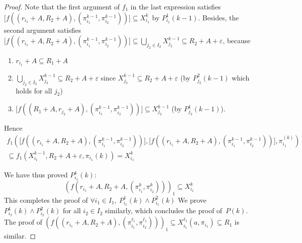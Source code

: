 \begin{proof}
 Note that  the first argument of $f_1$ in the last expression satisfies
  $\lbrack f((r_{i_1}+A,R_2+A),(\pi_{i_1}^{k-1},\pi_{i_2}^{k-1}))\rbrack \subseteq X_{i_1}^k $
  by $P_{i_1}^1(k-1)$. Besides, the second argument
  satisfies $\lbrack f((r_{i_1}+A,R_2+A),(\pi_{i_1}^{k-1},\pi_{i_2}^{k-1})) \rbrack
  \subseteq \bigcup_{j_2 \in I_2}X_{j_2}^{k-1} \subseteq R_2 + A + \varepsilon$, because 
  \begin{enumerate}
   \item $r_{i_1} + A \subseteq R_{1}+A$
   \item $\bigcup_{j_2 \in I_2} X_{j_2}^{k-1} \subseteq R_2 + A + \varepsilon$ since $X_{j_2}^{k-1} \subseteq R_2 + A + \varepsilon$ \quad (by $P_{j_2}^2(k-1)$ which holds for all $j_2$)
   \item $\lbrack f((R_1 + A , r_{j_2} + A), (\pi_{i_1}^{k-1}, \pi_{i_2}^{k-1})) \rbrack 
  \subseteq X_{j_2}^{k-1}$ \quad (by $P_{j_2}^1(k-1)$).
  \end{enumerate}
  

 
 
 Hence 
 \begin{eqnarray*}
  f_1(\lbrack f((r_{i_1}+A,R_2+A),(\pi_{i_1}^{k-1},\pi_{i_2}^{k-1})) \rbrack,\lbrack f((r_{i_1}+A,R_2+A),(\pi_{i_1}^{k-1},\pi_{i_2}^{k-1})) \rbrack,\pi_{i_1}^{(k)} ) \\
  \subseteq f_1(X_{i_1}^{k-1},R_2 + A + \varepsilon,\pi_{i_1}(k)) = X_{i_1}^k
 \end{eqnarray*}

 
 We have thus proved $P_{i_1}^1(k)$:
 \begin{equation*}
 (f(r_{i_1} +A,R_2+A,(\pi_{i_1}^k,\pi_{i_2}^k)))_1 \subseteq X_{i_1}^k
\end{equation*}
This completes the proof of $\forall i_1 \in I_1,\  P_{i_1}^1(k) \wedge P_{i_1}^2(k)$
We prove $P_{i_2}^1(k) \wedge P_{i_2}^2(k)$ for all $i_2 \in I_2$ 
similarly, which concludes the proof of~$P(k)$.
%
The proof of
$(f((r_{i_1}+A,R_2+A),(\pi_{i_1}^{\ell_1},\pi_{i_2}^{\ell_1})))_1
\subseteq X_{i_1}^{\ell_1}(a,\pi_{i_1}) \subseteq R_1$ is similar.
% 
% 
\end{proof}



